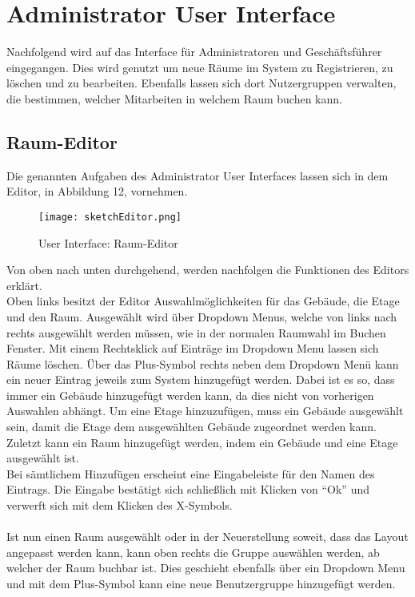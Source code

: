 \vspace{5cm}

\section{Administrator User Interface}

Nachfolgend wird auf das Interface für Administratoren und Geschäftsführer eingegangen. 
Dies wird genutzt um neue Räume im System zu Registrieren, zu löschen und zu bearbeiten.
Ebenfalls lassen sich dort Nutzergruppen verwalten, die bestimmen, welcher Mitarbeiten in welchem Raum buchen kann. 

\newpage
\subsection{Raum-Editor}
Die genannten Aufgaben des Administrator User Interfaces lassen sich in dem Editor, in Abbildung 12, vornehmen.

\begin{figure}[!h]
  \centering
  \texttt{[image: sketchEditor.png]}
  \caption{User Interface: Raum-Editor}
  \label{fig:sketch_RaumEditor}
\end{figure}

Von oben nach unten durchgehend, werden nachfolgen die Funktionen des Editors erklärt.
\\
Oben links besitzt der Editor Auswahlmöglichkeiten für das Gebäude, die Etage und den Raum.
Ausgewählt wird über Dropdown Menus, welche von links nach rechts ausgewählt werden müssen, wie in der normalen Raumwahl im Buchen Fenster.
Mit einem Rechtsklick auf Einträge im Dropdown Menu lassen sich Räume löschen.
Über das Plus-Symbol rechts neben dem Dropdown Menü kann ein neuer Eintrag jeweils zum System hinzugefügt werden.
Dabei ist es so, dass immer ein Gebäude hinzugefügt werden kann, da dies nicht von vorherigen Auswahlen abhängt. 
Um eine Etage hinzuzufügen, muss ein Gebäude ausgewählt sein, damit die Etage dem ausgewählten Gebäude zugeordnet werden kann.
Zuletzt kann ein Raum hinzugefügt werden, indem ein Gebäude und eine Etage ausgewählt ist.
\\
Bei sämtlichem Hinzufügen erscheint eine Eingabeleiste für den Namen des Eintrags.
Die Eingabe bestätigt sich schließlich mit Klicken von "`Ok"' und verwerft sich mit dem Klicken des X-Symbols.

\paragraph{} Ist nun einen Raum ausgewählt oder in der Neuerstellung soweit, dass das Layout angepasst werden kann, kann oben rechts die Gruppe auswählen werden, ab welcher der Raum buchbar ist.
Dies geschieht ebenfalls über ein Dropdown Menu und mit dem Plus-Symbol kann eine neue Benutzergruppe hinzugefügt werden. 

